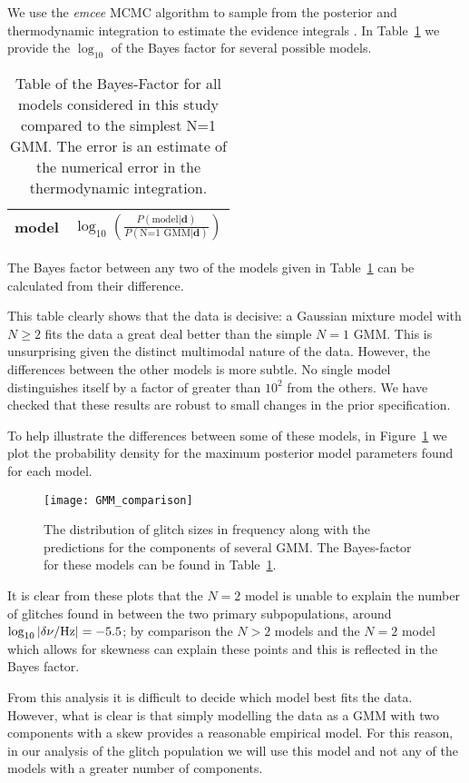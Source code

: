 \documentclass[../full_thesis/full_thesis.tex]{subfiles}
\newcommand{\thisdir}{../glitches_in_CGW}
\begin{document}
\begin{subappendices}
We use the \emph{emcee} \citep{Foreman-Mackay2013} MCMC algorithm to sample from the
posterior and thermodynamic integration to estimate the evidence integrals
\citep{Goggans2004}. In Table~\ref{tab: BF} we provide the $\log_{10}$ of the
Bayes factor for several possible models.
\begin{table}[htb]
\centering
\begin{tabular}{l|c}
model & $\log_{10}\left(
\frac{P(\textrm{model}| \mathbf{d})}{P(\textrm{N=1 GMM}| \mathbf{d})}
\right)$ \\ \hline

\end{tabular}
\caption{Table of the Bayes-Factor for all models considered in this study
compared to the simplest N=1 GMM. The error is an estimate of the numerical
error in the thermodynamic integration. }
\label{tab: BF}
\end{table}
The Bayes factor between any two of the models given in Table~\ref{tab: BF} can
be calculated from their difference.

This table clearly shows that the data is decisive: a Gaussian mixture model
with $N \ge 2$ fits the data a great deal better than the simple $N=1$ GMM.
This is unsurprising given the distinct multimodal nature of the data.
However, the differences between the other models is more subtle. No single model
distinguishes itself by a factor of greater than $10^{2}$ from the others. We
have checked that these results are robust to small changes in the prior
specification.

To help illustrate the differences between some of these models, in Figure~\ref{fig: pdf}
we plot the probability density for the maximum posterior model parameters
found for each model.
\begin{figure}[htb]
\centering
\texttt{[image: GMM\_comparison]}
\caption{The distribution of glitch sizes in frequency along with the predictions
         for the components of several GMM. The Bayes-factor for these models
         can be found in Table~\ref{tab: BF}.}
\label{fig: pdf}
\end{figure}
It is clear from these plots that the $N=2$ model is unable to explain
the number of glitches found in between the two primary subpopulations,
around $\log_{10}|\delta\nu/\textrm{Hz}|=-5.5$; by comparison the
$N>2$ models and the $N=2$ model which allows for skewness can explain these
points and this is reflected in the Bayes factor.

From this analysis it is difficult to decide which model best fits the data. However,
what is clear is that simply modelling the data as a GMM with two components with
a skew provides a reasonable empirical model. For this reason, in our analysis of the
glitch population we will use this model and not any of the
models with a greater number of components.


\end{subappendices}
\end{document}
